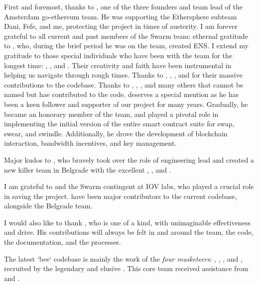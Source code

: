 First and foremost, thanks to , one of the three founders and team lead of the Amsterdam go-ethereum team. He was supporting the Ethersphere subteam Dani, Fefe, and me, protecting the project in times of austerity.
I am forever grateful to all current and past members of the Swarm team: ethernal gratitude to , who, during the brief period he was on the team, created ENS. I extend my gratitude to those special individuals who have been with the team for the longest time: , , and . Their creativity and faith have been instrumental in helping us navigate through rough  times. Thanks to , , , and  for their massive contributions to the codebase. Thanks to , , , and many others that cannot be named but hae contributed to the code.
 deserves a special mention as he has been a keen follower and supporter of our project for many years. Gradually, he became an honorary member of the team, and played a pivotal role in implementing the initial version of the entire smart contract suite for swap, swear, and swindle. Additionally, he drove the development of blockchain interaction, bandwidth incentives, and key management.

Major kudos to , who bravely took over the role of engineering lead and created a new killer team in Belgrade with the excellent , , and .  

I am grateful to  and the Swarm contingent at IOV labs, who played a crucial role in saving the project.  have been major contributors to the current codebase, alongside the Belgrade team. 

I would also like to thank , who is one of a kind, with unimaginable effectiveness and drive. His contributions will always be felt in and around the team, the code, the documentation, and the processes.

The latest `bee` codebase is mainly the work of the \emph{four musketeers}: , , , and , recruited by the legendary and elusive . This core team received assistance from  and .



